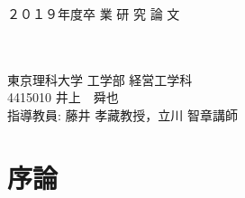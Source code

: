 \documentclass[12pt,a4j,notitlepage]{jreport}
\def\HUGE{\fontsize{36pt}{40pt}\selectfont} %
\begin{document}
\begin{titlepage}
\begin{center}\begin{LARGE}
{\large ２０１９年度\hspace{3em}卒  業  研  究  論  文}\vspace{3em}\\


\textbf{\HUGE{多目的進化計算における}}\\
\textbf{\HUGE{トーナメント選択の有効性の評価}}\\
\vspace{14em}


\vspace{0.8em}
{\LARGE\bf }

{東京理科大学 工学部 経営工学科}\\\vspace{0.8em}
{ 4415010 \hspace{3em}井上　舜也}\\
\vspace{1em}
{ 指導教員:  藤井 孝藏教授，立川 智章講師}

\end{LARGE}\end{center}
\end{titlepage}

\tableofcontents




\chapter{序論}
\end{document}
